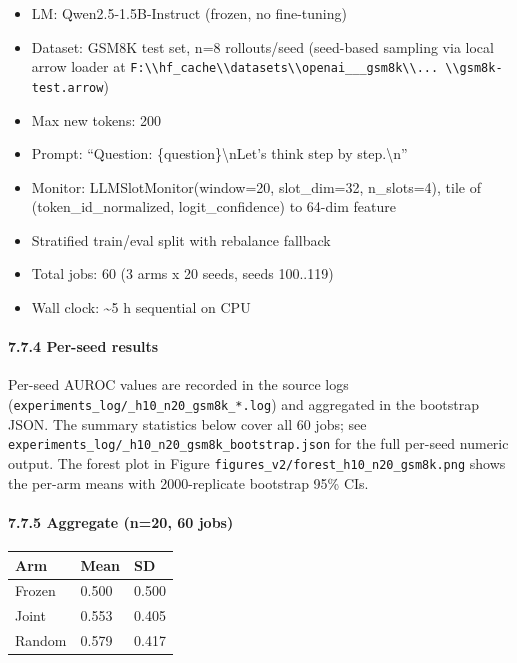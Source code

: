 \documentclass[
]{article}
\newcounter{none} %
\providecommand{\tightlist}{%
  \setlength{\itemsep}{0pt}\setlength{\parskip}{0pt}}
\begin{document}
\begin{itemize}
\tightlist
\item
  LM: Qwen2.5-1.5B-Instruct (frozen, no fine-tuning)
\item
  Dataset: GSM8K test set, n=8 rollouts/seed (seed-based sampling via
  local arrow loader at
  \texttt{F:\textbackslash{}\textbackslash{}hf\_cache\textbackslash{}\textbackslash{}datasets\textbackslash{}\textbackslash{}openai\_\_\_gsm8k\textbackslash{}\textbackslash{}...\ \textbackslash{}\textbackslash{}gsm8k-test.arrow})
\item
  Max new tokens: 200
\item
  Prompt: ``Question: \{question\}\textbackslash nLet's think step by
  step.\textbackslash n''
\item
  Monitor: LLMSlotMonitor(window=20, slot\_dim=32, n\_slots=4), tile of
  (token\_id\_normalized, logit\_confidence) to 64-dim feature
\item
  Stratified train/eval split with rebalance fallback
\item
  Total jobs: 60 (3 arms x 20 seeds, seeds 100..119)
\item
  Wall clock: \textasciitilde5 h sequential on CPU
\end{itemize}

\paragraph{7.7.4 Per-seed results}\label{per-seed-results-2}

Per-seed AUROC values are recorded in the source logs
(\texttt{experiments\_log/\_h10\_n20\_gsm8k\_*.log}) and aggregated in
the bootstrap JSON. The summary statistics below cover all 60 jobs; see
\texttt{experiments\_log/\_h10\_n20\_gsm8k\_bootstrap.json} for the full
per-seed numeric output. The forest plot in Figure
\texttt{figures\_v2/forest\_h10\_n20\_gsm8k.png} shows the per-arm means
with 2000-replicate bootstrap 95\% CIs.

\paragraph{7.7.5 Aggregate (n=20, 60 jobs)}\label{aggregate-n20-60-jobs}

{\def\LTcaptype{none} %
\begin{longtable}[]{@{}lll@{}}
\toprule\noalign{}
Arm & Mean & SD \\
\midrule\noalign{}
\endhead
\bottomrule\noalign{}
\endlastfoot
Frozen & 0.500 & 0.500 \\
Joint & 0.553 & 0.405 \\
Random & 0.579 & 0.417 \\
\end{longtable}
}
\end{document}
